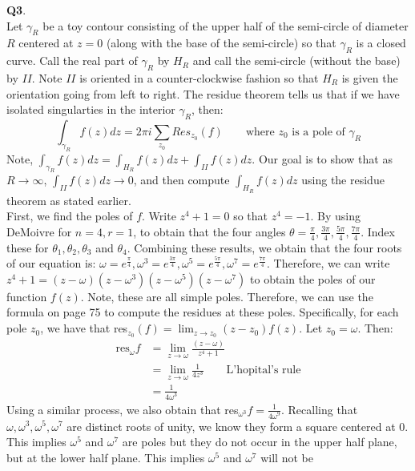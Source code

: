 \documentclass{article}
\begin{document}
    \textbf{Q3}.\\
    Let $\gamma_R$ be a toy contour consisting of the upper half of the semi-circle of diameter $R$ centered at $z=0$ 
    (along with the base of the 
    semi-circle) so that $\gamma_R$ is a closed curve. Call the real part of $\gamma_R$ by $H_R$ and call the semi-circle (without the
    base) by $II$. Note $II$ is oriented in a counter-clockwise fashion so that $H_R$ is given the orientation going from left to
    right. The residue theorem tells us that if we have isolated singularties in the interior $\gamma_R$, then:
    \[ \int_{\gamma_R} f(z)dz = 2\pi i\sum_{z_0} Res_{z_0}(f) \qquad\text{where $z_0$ is a pole of $\gamma_R$}\]
    Note, $\int_{\gamma_R} f(z)dz = \int_{H_R}f(z)dz + \int_{II} f(z)dz$. Our goal is to show that as $R\to\infty$, 
    $\int_{II}f(z)dz\to0$, and then compute $\int_{H_R}f(z)dz$ using the residue theorem as stated earlier.\\
    First, we find the poles of $f$. Write $z^4 + 1 = 0$ so that $z^4 = -1$. By using DeMoivre for $n=4,r=1$, to obtain that
    the four angles $\theta = \frac{\pi}{4}, \frac{3\pi}{4}, \frac{5\pi}{4}, \frac{7\pi}{4}$. Index these for $\theta_1,\theta_2,
    \theta_3$ and $\theta_4$. Combining these results, we obtain that the four roots of our equation is: $\omega=e^{\frac{\pi}{4}},
    \omega^3=e^{\frac{3\pi}{4}},\omega^5=e^{\frac{5\pi}{4}},\omega^7=e^{\frac{7\pi}{4}}$. Therefore, we can write
    $z^4 + 1 = (z-\omega)(z-\omega^3)(z-\omega^5)(z-\omega^7)$ to obtain the poles of our function $f(z)$. Note, these are 
    all simple poles. Therefore, we can use the formula on page 75 to compute the residues at these poles. Specifically, for each
    pole $z_0$, we have that res$_{z_0}(f) = \lim_{z\to z_0}(z-z_0)f(z)$. Let $z_0=\omega$. Then:
    \begin{align*}
        \text{res}_{\omega}f &= \lim_{z\to\omega}\frac{(z-\omega)}{z^4+1} \\
        &= \lim_{z\to\omega} \frac{1}{4z^3} \qquad \text{L'hopital's rule} \\
        &= \frac{1}{4\omega^3}
    \end{align*}
    Using a similar process, we also obtain that res$_{\omega^3}f = \frac{1}{4\omega^9}$. Recalling that $\omega,\omega^3,\omega^5,
    \omega^7$ are distinct roots of unity, we know they form a square centered at 0. This implies $\omega^5$ and $\omega^7$ are poles
    but they do not occur in the upper half plane, but at the lower half plane. This implies $\omega^5$ and $\omega^7$ will not be
\end{document}
